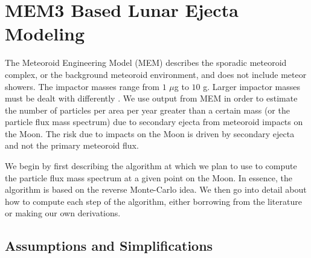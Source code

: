 \documentclass{hitec}
\numberwithin{equation}{section}
\begin{document}
\section{MEM3 Based Lunar Ejecta Modeling}
\label{sec:MEM3 Based Lunar Ejecta Modeling}
The \textsf{Meteoroid Engineering Model} (MEM) describes the sporadic meteoroid complex, or the background meteoroid environment, and does not include meteor showers. The impactor masses range from $1$ $\mu$g to $10$ g. Larger impactor masses must be dealt with differently \citep[e.g., see][]{neukum2001cratering, brown2002flux}.
We use output from MEM in order to estimate the number of particles per area per year greater than a certain mass (or the particle flux mass spectrum) due to secondary ejecta from meteoroid impacts on the Moon. The risk due to impacts on the Moon is driven by secondary ejecta and not the primary meteoroid flux.

We begin by first describing the algorithm at which we plan to use to compute the particle flux mass spectrum at a given point on the Moon. In essence, the algorithm is based on the reverse Monte-Carlo idea. We then go into detail about how to compute each step of the algorithm, either borrowing from the literature or making our own derivations.


\subsection{Assumptions and Simplifications}\label{ssec:assumptions}
\end{document}

